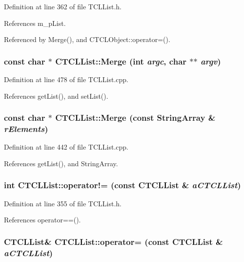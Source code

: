 Definition at line 362 of file TCLList.h.

References m\_\-p\-List.

Referenced by Merge(), and CTCLObject::operator=().
\subsubsection{\setlength{\rightskip}{0pt plus 5cm}const char $\ast$ CTCLList::Merge (int {\em argc}, char $\ast$$\ast$ {\em argv})}\label{classCTCLList_a12}




Definition at line 478 of file TCLList.cpp.

References get\-List(), and set\-List().
\subsubsection{\setlength{\rightskip}{0pt plus 5cm}const char $\ast$ CTCLList::Merge (const {\bf String\-Array} \& {\em r\-Elements})}\label{classCTCLList_a11}




Definition at line 442 of file TCLList.cpp.

References get\-List(), and String\-Array.
\subsubsection{\setlength{\rightskip}{0pt plus 5cm}int CTCLList::operator!= (const CTCLList \& {\em a\-CTCLList})\hspace{0.3cm}{\tt  [inline]}}\label{classCTCLList_a7}




Definition at line 355 of file TCLList.h.

References operator==().
\subsubsection{\setlength{\rightskip}{0pt plus 5cm}CTCLList\& CTCLList::operator= (const CTCLList \& {\em a\-CTCLList})\hspace{0.3cm}{\tt  [inline]}}\label{classCTCLList_a5}




